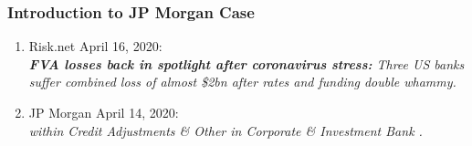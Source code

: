 \documentclass[main.tex]{subfiles}
\begin{document}
    \begin{frame}
        \frametitle{Introduction to JP Morgan Case}

        \begin{enumerate}
            \item Risk.net April 16, 2020: \\
            \textit{%
                \textbf{FVA losses back in spotlight after coronavirus stress:} 
                Three US banks suffer combined loss of almost 
                \$2bn after rates and funding double whammy.
            }
            \item JP Morgan April 14, 2020: \\
            \textit{%
                \underline{} 
                within Credit Adjustments \& Other in Corporate \& Investment Bank 
                \underline{}.
            }
        \end{enumerate}
    \end{frame}
\end{document}
